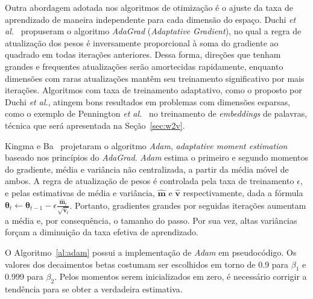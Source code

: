 Outra abordagem adotada nos algoritmos de otimização é o ajuste da taxa de aprendizado de maneira independente para cada dimensão do espaço. Duchi \textit{et al.}~\cite{duchi11} propuseram o algoritmo \textit{AdaGrad} (\textit{Adaptative Gradient}), no qual a regra de atualização dos pesos é inversamente proporcional à soma do gradiente ao quadrado em todas iterações anteriores. Dessa forma, direções que tenham grandes e frequentes atualizações serão amortecidas rapidamente, enquanto dimensões com raras atualizações mantêm seu treinamento significativo por mais iterações. Algoritmos com taxa de treinamento adaptativo, como o proposto por Duchi \textit{et al.}, atingem bons resultados em problemas com dimensões esparsas, como o exemplo de Pennington \textit{et al.}~\cite{pennington14} no treinamento de \textit{embeddings} de palavras, técnica que será apresentada na Seção~\ref{sec:w2v}.

Kingma e Ba~\cite{kingma14} projetaram o algoritmo \textit{Adam}, \textit{adaptative moment estimation} baseado nos princípios do \textit{AdaGrad}. \textit{Adam} estima o primeiro e segundo momentos do gradiente, média e variância não centralizada, a partir da média móvel de ambos. A regra de atualização de pesos é controlada pela taxa de treinamento $\epsilon$, e pelas estimativas de média e variância, $\mathbf{\hat{m}}$ e $\mathbf{\hat{v}}$ respectivamente, dada a fórmula $\boldsymbol{\theta}_{t} \gets \boldsymbol{\theta}_{t-1} - \epsilon \frac{\mathbf{\hat{m}}_{t}}{\sqrt{\mathbf{\hat{v}}_{t}}} $. Portanto, gradientes grandes por seguidas iterações aumentam a média e, por consequência, o tamanho do passo. Por sua vez, altas variâncias forçam a diminuição da taxa efetiva de aprendizado.

O Algoritmo~\ref{al:adam} possui a implementação de \textit{Adam} em pseudocódigo. Os valores dos decaimentos betas costumam ser escolhidos em torno de 0.9 para $\beta_{1}$ e 0.999 para $\beta_{2}$. Pelos momentos serem inicializados em zero, é necessário corrigir a tendência para se obter a verdadeira estimativa.

